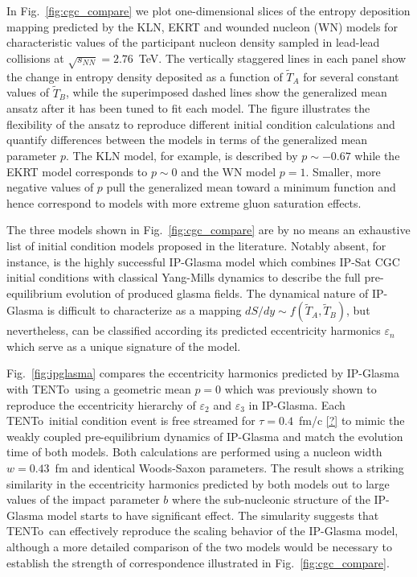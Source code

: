 \documentclass[aps,prc,reprint,amsmath,nofootinbib,superscriptaddress]{revtex4-1}
\newcommand{\trento}{T\raisebox{-0.5ex}{R}ENTo}
\newcommand{\sqrts}{\sqrt{s_{NN}}}
\newcommand{\T}{\tilde{T}}
\begin{document}
In Fig.~\ref{fig:cgc_compare} we plot one-dimensional slices of the entropy deposition mapping predicted by the KLN, EKRT and wounded nucleon (WN) models for characteristic values of the participant nucleon density sampled in lead-lead collisions at $\sqrts=2.76$~TeV. The vertically staggered lines in each panel show the change in entropy density deposited as a function of $\T_A$ for several constant values of $\T_B$, while the superimposed dashed lines show the generalized mean ansatz after it has been tuned to fit each model. The figure illustrates the flexibility of the ansatz to reproduce different initial condition calculations and quantify differences between the models in terms of the generalized mean parameter $p$. The KLN model, for example, is described by $p\sim-0.67$ while the EKRT model corresponds to $p \sim 0$ and the WN model $p=1$. Smaller, more negative values of $p$ pull the generalized mean toward a minimum function and hence correspond to models with more extreme gluon saturation effects.

The three models shown in Fig.~\ref{fig:cgc_compare} are by no means an exhaustive list of initial condition models proposed in the literature. Notably absent, for instance, is the highly successful IP-Glasma model which combines IP-Sat CGC initial conditions with classical Yang-Mills dynamics to describe the full pre-equilibrium evolution of produced glasma fields. The dynamical nature of IP-Glasma is difficult to characterize as a mapping ${dS/dy \sim f(\T_A,\T_B)}$, but nevertheless, can be classified according its predicted eccentricity harmonics $\varepsilon_n$ which serve as a unique signature of the model.

Fig.~\ref{fig:ipglasma} compares the eccentricity harmonics predicted by IP-Glasma with \trento\ using a geometric mean ${p=0}$ which was previously shown to reproduce the eccentricity hierarchy of $\varepsilon_2$ and $\varepsilon_3$ in IP-Glasma. Each \trento\ initial condition event is free streamed for $\tau=0.4$~fm/c \ref{?} to mimic the weakly coupled pre-equilibrium dynamics of IP-Glasma and match the evolution time of both models. Both calculations are performed using a nucleon width $w=0.43$~fm and identical Woods-Saxon parameters. The result shows a striking similarity in the eccentricity harmonics predicted by both models out to large values of the impact parameter $b$ where the sub-nucleonic structure of the IP-Glasma model starts to have significant effect. The simularity suggests that \trento\ can effectively reproduce the scaling behavior of the IP-Glasma model, although a more detailed comparison of the two models would be necessary to establish the strength of correspondence illustrated in Fig.~\ref{fig:cgc_compare}.
\end{document}
